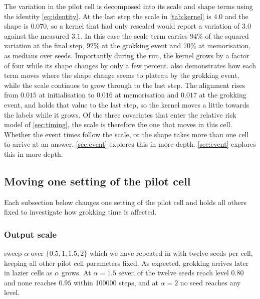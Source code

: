 \documentclass[a4paper,11pt]{article} %
\begin{document}
The variation in the pilot cell is decomposed into its scale and shape terms using the identity \eqref{eq:identity}.
At the last step the scale in \cref{tab:kernel} is $4.0$ and the shape is $0.070$, so a kernel that had only rescaled
would report a variation of $3.0$ against the measured $3.1$. In this case the scale term carries $94\%$ of the squared variation at the final step,
$92\%$ at the grokking event and $70\%$ at memorisation, as medians over seeds. Importantly during the run,
the kernel grows by a factor of four while its shape changes by only a few percent.
 also demonstrates how each term moves where the shape change seems to plateau by the grokking event,
while the scale continues to grow through to the last step. The alignment rises from $0.015$ at initialisation to $0.016$ at memorisation and
$0.017$ at the grokking event, and holds that value to the last step, so the kernel moves a
little towards the labels while it grows.
Of the three covariates that enter the relative risk model of
\cref{sec:timing}, the scale is therefore the one that moves in this cell. Whether the
event times follow the scale, or the shape takes more than one cell to arrive at an answer.
\cref{sec:event} explores this in more depth.
\cref{sec:event} explores this in more depth.

\FloatBarrier

\subsection{Moving one setting of the pilot cell}\label{sec:sweeps}

Each subsection below changes one setting of the pilot cell and holds all others fixed to investigate how grokking time is affected.

\subsubsection{Output scale}\label{sec:alpha}

\citet{kumarGrokkingTransitionLazy2024} sweep $\alpha$ over $\{0.5, 1, 1.5, 2\}$ which we have repeated in  with twelve seeds per cell, keeping all other pilot cell parameters fixed.
As expected, grokking arrives later in lazier cells as $\alpha$ grows. At $\alpha=1.5$ seven of the
twelve seeds reach level $0.80$ and none reaches $0.95$ within \num{100000} steps, and at
$\alpha=2$ no seed reaches any level.
\end{document}

